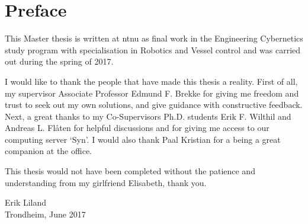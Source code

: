 
\section*{\huge Preface}
\hfill
\noindent 

This Master thesis is written at \gls{ntnu} as final work in the Engineering Cybernetics study program with specialisation in Robotics and Vessel control and was carried out during the spring of 2017.

I would like to thank the people that have made this thesis a reality. First of all, my supervisor Associate Professor Edmund F. Brekke for giving me freedom and trust to seek out my own solutions, and give guidance with constructive feedback. Next, a great thanks to my Co-Supervisors Ph.D. students Erik F. Wilthil and Andreas L. Flåten for helpful discussions and for giving me access to our computing server `Syn'. I would also thank Paal Kristian for a being a great companion at the office.

This thesis would not have been completed without the patience and understanding from my girlfriend Elisabeth, thank you.

\vspace{2 cm} 
\begin{center}
Erik Liland \\
Trondheim, June 2017
\end{center}
